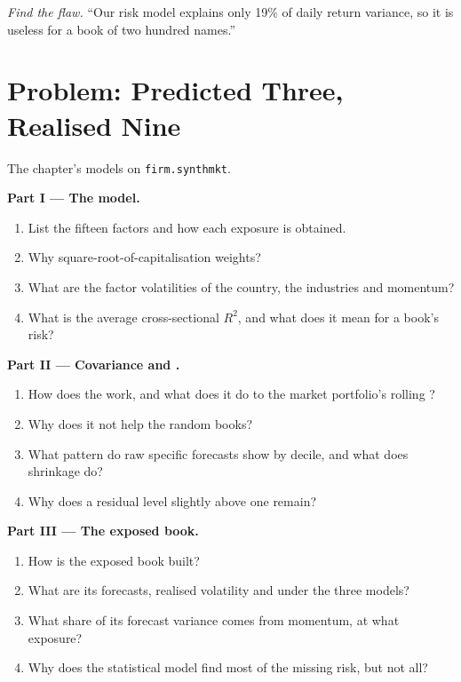 \begin{exercise}[$\star\star\star$]\label{exo:rs:risk-models:8}
\emph{Find the flaw.} ``Our risk model explains only 19\% of daily return variance, so it is useless for a book of two hundred names.''
\end{exercise}

\section{Problem: Predicted Three, Realised Nine}

\begin{problem}\label{pb:rs:risk-models:1}
The chapter's models on \texttt{firm.synthmkt}.

\medskip\noindent\textbf{Part I --- The model.}
\begin{enumerate}
\item List the fifteen factors and how each exposure is obtained.
\item Why square-root-of-capitalisation weights?
\item What are the factor volatilities of the country, the industries and momentum?
\item What is the average cross-sectional $R^2$, and what does it mean for a book's risk?
\end{enumerate}

\medskip\noindent\textbf{Part II --- Covariance and .}
\begin{enumerate}[resume]
\item How does the  work, and what does it do to the market portfolio's rolling ?
\item Why does it not help the random books?
\item What pattern do raw specific forecasts show by decile, and what does shrinkage do?
\item Why does a residual level slightly above one remain?
\end{enumerate}

\medskip\noindent\textbf{Part III --- The exposed book.}
\begin{enumerate}[resume]
\item How is the exposed book built?
\item What are its forecasts, realised volatility and  under the three models?
\item What share of its forecast variance comes from momentum, at what exposure?
\item Why does the statistical model find most of the missing risk, but not all?
\end{enumerate}


\end{problem}
